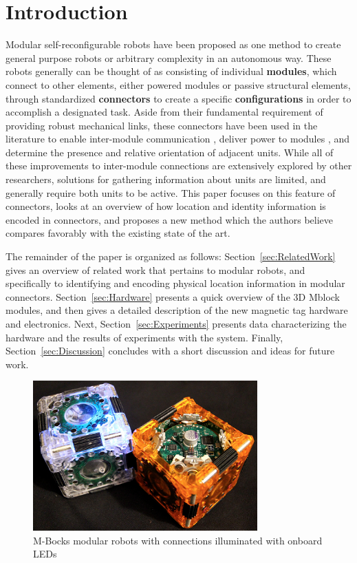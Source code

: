 \section{Introduction}
\label{sec:Introduction}

Modular self-reconfigurable robots have been proposed as one method to create general purpose robots or arbitrary complexity in an autonomous way. These robots generally can be thought of as consisting of individual \textbf{modules}, which connect to other elements, either powered modules or passive structural elements, through standardized \textbf{connectors} to create a specific \textbf{configurations} in order to accomplish a designated task. Aside from their fundamental requirement of providing robust mechanical links, these connectors have been used in the literature to enable inter-module communication \cite{liedke2013collective} \cite{TosunDaveyLiuYim-IROS2016}, deliver power to modules \cite{foobar} \cite{quux}, and determine the presence and relative orientation of adjacent units. While all of these improvements to inter-module connections are extensively explored by other researchers, solutions for gathering information about units are limited, and generally require both units to be active.  This paper focuses on this feature of connectors, looks at an overview of how location and identity information is encoded in connectors, and proposes a new method which the authors believe compares favorably with the existing state of the art.

The remainder of the paper is organized as follows:
Section~\ref{sec:RelatedWork} gives an overview of related
work that pertains to modular robots, and specifically to identifying and encoding physical location information in modular connectors.
Section~\ref{sec:Hardware} presents a quick overview of the 3D Mblock modules, and then gives a detailed description of the new magnetic tag hardware and electronics.
Next, Section~\ref{sec:Experiments}
presents data characterizing the hardware and the results of
experiments with the system.
Finally, Section~\ref{sec:Discussion}
concludes with a short discussion and ideas for future work.

\begin{figure}[htb]

  \centering
  \includegraphics[width=3.4in]{Figures/cover.png}

  \caption{M-Bocks modular robots with connections illuminated with onboard LEDs}

  \label{fig:cover}
\end{figure}
